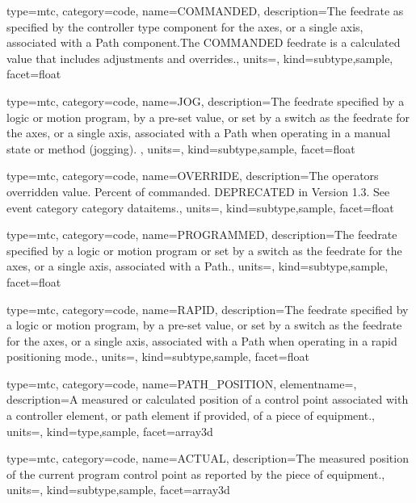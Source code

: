 {
  type=mtc,
  category=code,
  name={COMMANDED},
  description={The feedrate as specified by the \gls{controller} type component for the axes, or a single axis, associated with a Path component.The COMMANDED feedrate is a calculated value that includes adjustments and overrides.},
  units=,
  kind={subtype,sample},
  facet={\gls{float}}
}


{
  type=mtc,
  category=code,
  name={JOG},
  description={The feedrate specified by a logic or motion program, by a pre-set value, or set by a switch as the feedrate for the axes, or a single axis, associated with a Path when operating in a manual state or method (jogging).  },
  units=,
  kind={subtype,sample},
  facet={\gls{float}}
}


{
  type=mtc,
  category=code,
  name={OVERRIDE},
  description={The operators overridden value.  Percent of commanded. DEPRECATED in Version 1.3.   See \gls{event category} category \glspl{dataitem}.},
  units=,
  kind={subtype,sample},
  facet={\gls{float}}
}


{
  type=mtc,
  category=code,
  name={PROGRAMMED},
  description={The feedrate specified by a logic or motion program or set by a switch as the feedrate for the axes, or a single axis, associated with a Path.},
  units=,
  kind={subtype,sample},
  facet={\gls{float}}
}


{
  type=mtc,
  category=code,
  name={RAPID},
  description={The feedrate specified by a logic or motion program, by a pre-set value, or set by a switch as the feedrate for the axes, or a single axis, associated with a Path when operating in a rapid positioning mode.},
  units=,
  kind={subtype,sample},
  facet={\gls{float}}
}


{
  type=mtc,
  category=code,
  name={PATH\_POSITION},
  elementname=,
  description={A measured or calculated position of a control point associated with a \gls{controller} element, or \gls{path} element if provided, of a piece of equipment.},
  units=,
  kind={type,sample},
  facet={\gls{array3d}}
}


{
  type=mtc,
  category=code,
  name={ACTUAL},
  description={The measured position of the current program control point as reported by the piece of equipment.},
  units=,
  kind={subtype,sample},
  facet={\gls{array3d}}
}


